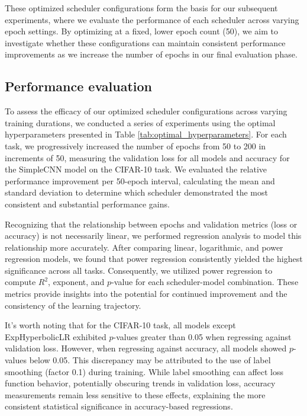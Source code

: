 \documentclass{article}
\theoremstyle{plain}
\theoremstyle{definition}
\theoremstyle{remark}
\begin{document}
These optimized scheduler configurations form the basis for our subsequent experiments, where we evaluate the performance of each scheduler across varying epoch settings.
By optimizing at a fixed, lower epoch count (50), we aim to investigate whether these configurations can maintain consistent performance improvements as we increase the number of epochs in our final evaluation phase.

\subsection{Performance evaluation}

To assess the efficacy of our optimized scheduler configurations across varying training durations, we conducted a series of experiments using the optimal hyperparameters presented in Table \ref{tab:optimal_hyperparameters}.
For each task, we progressively increased the number of epochs from 50 to 200 in increments of 50, measuring the validation loss for all models and accuracy for the SimpleCNN model on the CIFAR-10 task.
We evaluated the relative performance improvement per 50-epoch interval, calculating the mean and standard deviation to determine which scheduler demonstrated the most consistent and substantial performance gains.

Recognizing that the relationship between epochs and validation metrics (loss or accuracy) is not necessarily linear, we performed regression analysis to model this relationship more accurately.
After comparing linear, logarithmic, and power regression models, we found that power regression consistently yielded the highest significance across all tasks.
Consequently, we utilized power regression to compute $R^2$, exponent, and $p$-value for each scheduler-model combination.
These metrics provide insights into the potential for continued improvement and the consistency of the learning trajectory.

It's worth noting that for the CIFAR-10 task, all models except ExpHyperbolicLR exhibited $p$-values greater than 0.05 when regressing against validation loss.
However, when regressing against accuracy, all models showed $p$-values below 0.05.
This discrepancy may be attributed to the use of label smoothing (factor 0.1) during training.
While label smoothing can affect loss function behavior, potentially obscuring trends in validation loss, accuracy measurements remain less sensitive to these effects, explaining the more consistent statistical significance in accuracy-based regressions.
\end{document}
